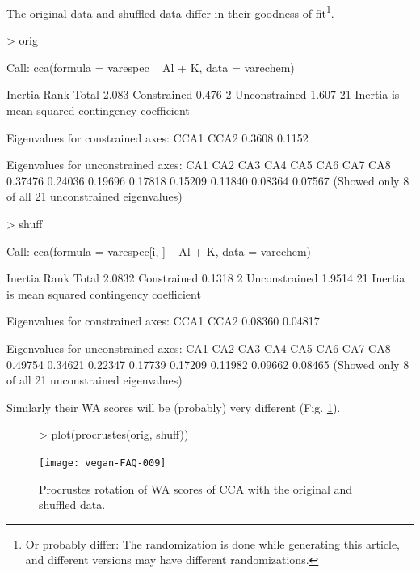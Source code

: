 \documentclass[a4paper]{article}
\begin{document}
The original data and shuffled data differ in their goodness of
fit\footnote{Or probably differ: The randomization is done while
generating this article, and different versions may have different
randomizations.}.
\begin{Schunk}
\begin{Sinput}
> orig
\end{Sinput}
\begin{Soutput}
Call:
cca(formula = varespec ~ Al + K, data = varechem) 

              Inertia Rank
Total           2.083     
Constrained     0.476    2
Unconstrained   1.607   21
Inertia is mean squared contingency coefficient 

Eigenvalues for constrained axes:
  CCA1   CCA2 
0.3608 0.1152 

Eigenvalues for unconstrained axes:
    CA1     CA2     CA3     CA4     CA5     CA6     CA7     CA8 
0.37476 0.24036 0.19696 0.17818 0.15209 0.11840 0.08364 0.07567 
(Showed only 8 of all 21 unconstrained eigenvalues)
\end{Soutput}
\begin{Sinput}
> shuff
\end{Sinput}
\begin{Soutput}
Call:
cca(formula = varespec[i, ] ~ Al + K, data = varechem) 

              Inertia Rank
Total          2.0832     
Constrained    0.1318    2
Unconstrained  1.9514   21
Inertia is mean squared contingency coefficient 

Eigenvalues for constrained axes:
   CCA1    CCA2 
0.08360 0.04817 

Eigenvalues for unconstrained axes:
    CA1     CA2     CA3     CA4     CA5     CA6     CA7     CA8 
0.49754 0.34621 0.22347 0.17739 0.17209 0.11982 0.09662 0.08465 
(Showed only 8 of all 21 unconstrained eigenvalues)
\end{Soutput}
\end{Schunk}
Similarly their WA scores will be (probably) very different
(Fig. \ref{fig:ccawa}). 
\begin{figure}
\begin{center}
\begin{Schunk}
\begin{Sinput}
> plot(procrustes(orig, shuff))
\end{Sinput}
\end{Schunk}
\texttt{[image: vegan-FAQ-009]}
\caption{Procrustes rotation of WA scores of CCA with the original and
  shuffled data.}
\label{fig:ccawa}
\end{center}
\end{figure}
\end{document}

